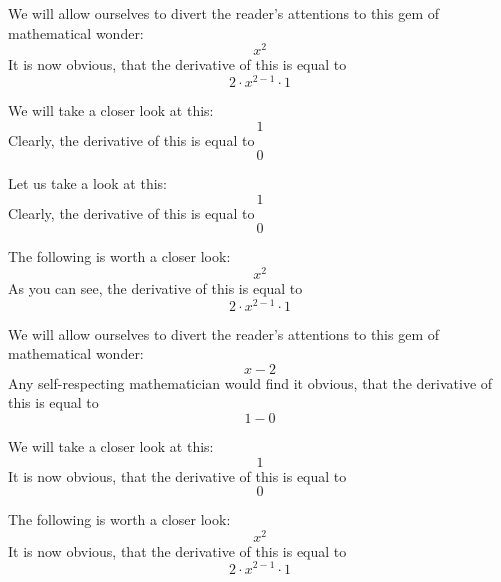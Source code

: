 \documentclass{article}
\begin{document}
We will allow ourselves to divert the reader's attentions to this gem of mathematical wonder:
\begin{equation}
x ^{2 } 
\end{equation}
It is now obvious, that the derivative of this is equal to
\begin{equation}
2 \cdot x ^{2 - 1 } \cdot 1 
\end{equation}

We will take a closer look at this:
\begin{equation}
1 
\end{equation}
Clearly, the derivative of this is equal to
\begin{equation}
0 
\end{equation}

Let us take a look at this:
\begin{equation}
1 
\end{equation}
Clearly, the derivative of this is equal to
\begin{equation}
0 
\end{equation}

The following is worth a closer look:
\begin{equation}
x ^{2 } 
\end{equation}
As you can see, the derivative of this is equal to
\begin{equation}
2 \cdot x ^{2 - 1 } \cdot 1 
\end{equation}

We will allow ourselves to divert the reader's attentions to this gem of mathematical wonder:
\begin{equation}
x - 2 
\end{equation}
Any self-respecting mathematician would find it obvious, that the derivative of this is equal to
\begin{equation}
1 - 0 
\end{equation}

We will take a closer look at this:
\begin{equation}
1 
\end{equation}
It is now obvious, that the derivative of this is equal to
\begin{equation}
0 
\end{equation}

The following is worth a closer look:
\begin{equation}
x ^{2 } 
\end{equation}
It is now obvious, that the derivative of this is equal to
\begin{equation}
2 \cdot x ^{2 - 1 } \cdot 1 
\end{equation}
\end{document}
